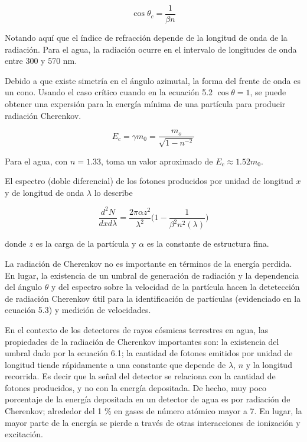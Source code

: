\documentclass{book}
\begin{document}
\begin{equation}
\cos\theta_c=\frac{1}{\beta n}
\end{equation}

Notando aqu\'i que el \'indice de refracci\'on depende de la longitud de onda de la radiaci\'on. Para el agua, la radiaci\'on ocurre en el intervalo de longitudes de onda entre 300 y 570 nm. \citep{PEREZ}

Debido a que existe simetr\'ia en el \'angulo azimutal, la forma del frente de onda es un cono. Usando el caso cr\'itico cuando en la ecuaci\'on 5.2 $\cos\theta=1$, se puede obtener una expersi\'on para la energ\'ia m\'inima de una part\'icula para producir radiaci\'on Cherenkov.

\begin{equation}
E_c=\gamma m_0=\frac{m_o}{\sqrt{1-n^{-2}}}
\end{equation}

Para el agua, con $n=1.33$, toma un valor aproximado de $E_c\approx1.52m_0$. \citep{PEREZ}

El espectro (doble diferencial) de los fotones producidos por unidad de longitud $x$ y de longitud de onda $\lambda$ lo describe

\begin{equation}
\frac{d^2N}{dxd\lambda}=\frac{2\pi\alpha z^2}{\lambda^2}\Bigg(1-\frac{1}{\beta^2n^2(\lambda)}\Bigg)
\end{equation}

donde $z$ es la carga de la part\'icula y $\alpha$ es la constante de estructura fina. \citep{BALDINI}

La radiaci\'on de Cherenkov no es importante en t\'erminos de la energ\'ia perdida. En lugar, la existencia de un umbral de generaci\'on de radiaci\'on y la dependencia del \'angulo $\theta$ y del espectro sobre la velocidad de la part\'icula hacen la detetecci\'on de radiaci\'on Cherenkov \'util para la identificaci\'on de part\'iculas (evidenciado en la ecuaci\'on 5.3) y medici\'on de velocidades. \citep{BALDINI}

En el contexto de los detectores de rayos c\'osmicas terrestres en agua, las propiedades de la radiaci\'on de Cherenkov importantes son: la existencia del umbral dado por la ecuaci\'on 6.1; la cantidad de fotones emitidos por unidad de longitud tiende r\'apidamente a una constante que depende de $\lambda$, $n$ y la longitud recorrida. Es decir que la se\~nal del detector se relaciona con la cantidad de fotones producidos, y no con la energ\'ia depositada. De hecho, muy poco porcentaje de la energ\'ia depositada en un detector de agua es por radiaci\'on de Cherenkov; alrededor del 1 \% en gases de n\'umero at\'omico mayor a 7. En lugar, la mayor parte de la energ\'ia se pierde a trav\'es de otras interacciones de ionizaci\'on y excitaci\'on. \citep{PEREZ} \citep{GROUPENS}
\end{document}
